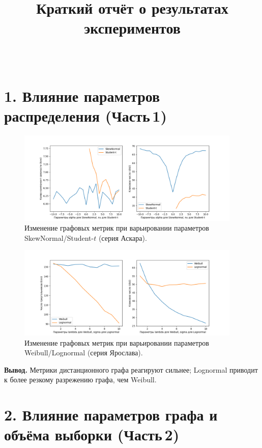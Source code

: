 \documentclass[a4paper,12pt]{article}
\title{Краткий отчёт о результатах экспериментов}
\author{~}
\date{}
\begin{document}
\maketitle

\section*{1. Влияние параметров распределения (Часть\,1)}

\begin{figure}[H]
    \centering
    \includegraphics[width=0.95\textwidth]{Graphics/part1_results_Askar.png}
    \caption{Изменение графовых метрик при варьировании параметров SkewNormal/Student-$t$ (серия Аскара).}
    \label{fig:part1-askar}
\end{figure}

\begin{figure}[H]
    \centering
    \includegraphics[width=0.95\textwidth]{Graphics/part1_results_Yaroslav.png}
    \caption{Изменение графовых метрик при варьировании параметров Weibull/Lognormal (серия Ярослава).}
    \label{fig:part1-yaroslav}
\end{figure}

\noindent\textbf{Вывод.} Метрики дистанционного графа реагируют сильнее; Lognormal приводит к более резкому разрежению графа, чем Weibull.

\section*{2. Влияние параметров графа и объёма выборки (Часть\,2)}
\end{document}
